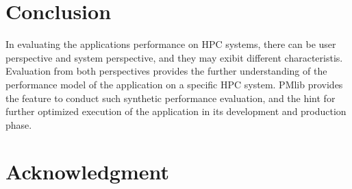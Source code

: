 \documentclass[conference]{IEEEtran}
\begin{document}
\section{Conclusion}
In evaluating the applications performance on HPC systems, there can be
user perspective and system perspective, and they may exibit different
characteristis.
Evaluation from both perspectives provides the further understanding of
the performance model of the application on a specific HPC system.
PMlib provides the feature to conduct such synthetic performance
evaluation, and the hint for further optimized execution of
the application in its development and production phase.

\section*{Acknowledgment}


\end{document}
